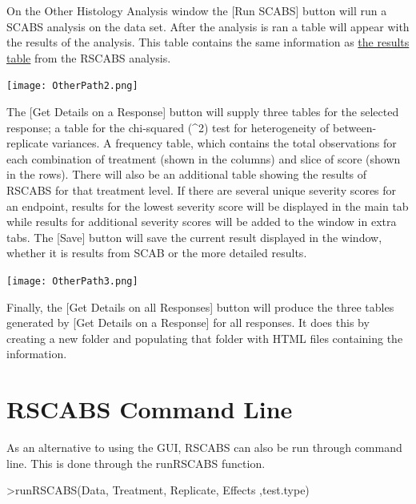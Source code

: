 \documentclass[a4paper]{article}
\begin{document}
 On the Other Histology Analysis window the [Run SCABS] button will run a SCABS analysis on the data set.  
 After the analysis is ran a table will appear with the results of the analysis. This table contains the same information as 
 \hyperlink{fig:Results}{the results table} from the RSCABS analysis.

 
 
\begin{center}
\texttt{[image: OtherPath2.png]}
\end{center} 
\par
	
 The [Get Details on a Response] button will supply three tables for the selected response; a table for the 
 chi-squared ({\chi}^2) \) test for heterogeneity of between-replicate variances. A frequency table, which contains the total observations
 for each combination of treatment (shown in the columns) and slice of score (shown in the rows). 
 There will also be an additional table showing the results of RSCABS for that treatment level.  
 If there are several unique severity scores for an endpoint, results for the lowest severity score will be displayed 
 in the main tab while results for additional severity scores will be added to the window in extra tabs. 
The [Save] button will save the current result displayed in the window, whether it is results from SCAB 
or the more detailed results. 
 
 
 
\begin{center}
\texttt{[image: OtherPath3.png]}
\end{center} 
\par
	
Finally, the [Get Details on all Responses] button will produce the three tables generated by 
[Get Details on a Response] for all responses.  It does this by creating a new folder and populating that folder with HTML files 
containing the information.  

 \section*{RSCABS Command Line}
\label{sec:RSCABSCMD}
\thispagestyle{plain}

As an alternative to using the GUI, RSCABS can also be run through command line.  This is done through  the runRSCABS function.  

\begin{RBox}
>runRSCABS(Data, Treatment, Replicate, Effects ,test.type)
\end{RBox}     
\end{document}
